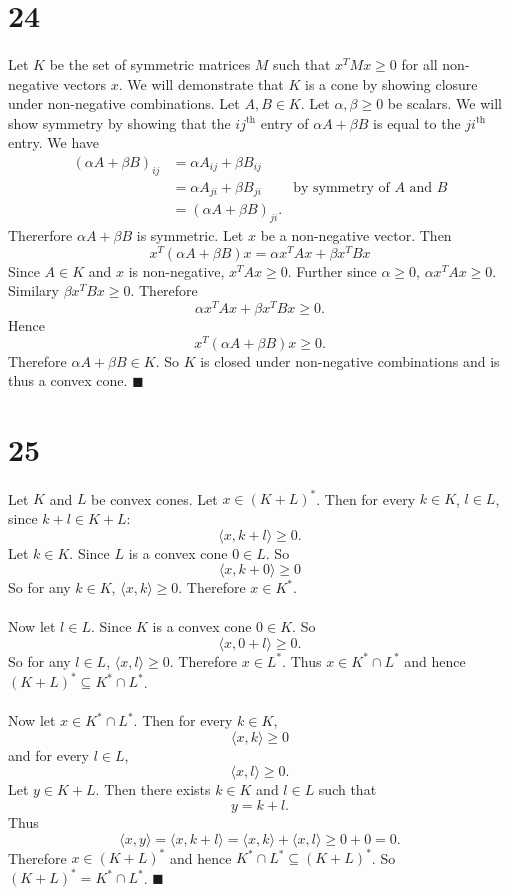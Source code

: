 \documentclass[letterpaper,12pt,oneside,onecolumn]{article}
\begin{document}
\section*{24}
\paragraph{}
Let $K$ be the set of symmetric matrices $M$ such that $x^TMx \geq 0$ for all non-negative vectors $x$. We will demonstrate that $K$ is a cone by showing closure under non-negative combinations. Let $A, B \in K$. Let $\alpha, \beta \geq 0$ be scalars. We will show symmetry by showing that the $ij^\text{th}$ entry of $\alpha A + \beta B$ is equal to the $ji^\text{th}$ entry. We have
\begin{align*}
(\alpha A + \beta B)_{ij} &= \alpha A_{ij} + \beta B_{ij} \\
&=\alpha A_{ji} + \beta B_{ji} &\text{by symmetry of $A$ and $B$} \\
&= (\alpha A + \beta B)_{ji}.
\end{align*}
Thererfore $\alpha A + \beta B$ is symmetric.
Let $x$ be a non-negative vector. Then 
$$ x^T(\alpha A + \beta B) x = \alpha x^TAx + \beta x^TBx
$$
Since $A \in K$ and $x$ is non-negative, $x^TAx \geq 0$. Further since $\alpha \geq 0$, $\alpha x^T A x \geq 0$. Similary $\beta x^TBx \geq 0$. Therefore
$$\alpha x^TAx + \beta x^TB x \geq 0.$$
Hence $$x^T(\alpha A + \beta B) x \geq 0.$$
Therefore $\alpha A + \beta B \in K$. So $K$ is closed under non-negative combinations and is thus a convex cone. $\blacksquare$
\section*{25}
\paragraph{}
Let $K$ and $L$ be convex cones. Let $x \in (K+L)^*$. Then for every $k \in K$, $l \in L$, since $k+l \in K+L$:
$$\langle x,k+l \rangle \geq 0.$$
Let $k \in K$. Since $L$ is a convex cone $0 \in L$. So $$\langle x, k+0 \rangle \geq 0$$
So for any $k \in K$, $\langle x, k \rangle \geq 0$. Therefore $x \in K^*$.
\paragraph{}
Now let $l \in L$. Since $K$ is a convex cone $0 \in K$. So $$\langle x, 0+l \rangle \geq 0.$$
So for any $l \in L$, $\langle x, l \rangle \geq 0$. Therefore $x \in L^*$. Thus $x \in K^* \cap L^*$ and hence $(K+L)^* \subseteq K^* \cap L^*$.
\paragraph{}
Now let $x \in K^* \cap L^*$. Then for every $k \in K$, $$\langle x, k \rangle \geq 0$$ and for every $l \in L$, $$\langle x, l \rangle \geq 0.$$
Let $y \in K+L$. Then there exists $k \in K$ and $l \in L$ such that $$y=k+l.$$ Thus
$$\langle x, y \rangle = \langle x, k+l \rangle = \langle x, k\rangle +\langle x, l \rangle \geq 0 + 0 = 0.$$
Therefore $x \in (K+L)^*$ and hence $K^* \cap L^* \subseteq (K+L)^*$. So $(K+L)^*= K^* \cap L^*$. $\blacksquare$
\end{document}
